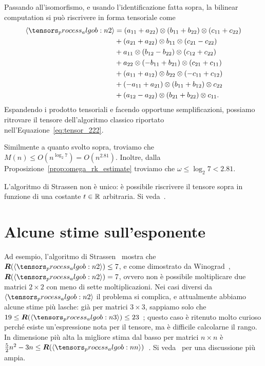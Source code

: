 Passando all'isomorfismo, e usando l'identificazione fatta sopra, la bilinear computation si può
riscrivere in forma tensoriale come
\begin{equation*}
	\begin{aligned}
		\algob{2} & = (a_{11} + a_{22}) \otimes (b_{11} + b_{22}) \otimes (c_{11} + c_{22}) \\
		          & + (a_{21} + a_{22}) \otimes b_{11} \otimes (c_{21} - c_{22})            \\
		          & + a_{11} \otimes (b_{12} - b_{22}) \otimes (c_{12} + c_{22})            \\
		          & + a_{22} \otimes (-b_{11} + b_{21}) \otimes (c_{21} + c_{11})           \\
		          & + (a_{11} + a_{12}) \otimes b_{22} \otimes (-c_{11} + c_{12})           \\
		          & + (-a_{11} + a_{21}) \otimes (b_{11} + b_{12}) \otimes c_{22}           \\ &+ (a_{12} - a_{22}) \otimes (b_{21} + b_{22}) \otimes c_{11}.
	\end{aligned}
\end{equation*}
Espandendo i prodotto tensoriali e facendo opportune semplificazioni, possiamo ritrovare il tensore
dell'algoritmo classico riportato nell'Equazione~\eqref{eq:tensor_222}.
\begin{remark}
	Similmente a quanto svolto sopra, troviamo che $ M(n) \le  O(n^{\log_{2}
				7}) = O(n^{2.81})$. Inoltre, dalla Proposizione~\ref{prop:omega_rk_estimate} troviamo che $ \omega
		\le \log_2 7 < 2.81$.
\end{remark}

\begin{remark}
	L'algoritmo di Strassen non è unico: è possibile riscrivere il tensore sopra in funzione di una
	costante $ t \in \mathbb{R} $ arbitraria. Si veda~\cite[Pag. 37]{landsberg2011tensors}.
\end{remark}

\section{Alcune stime sull'esponente}
\label{sec:exp_estimates}

Ad esempio, l'algoritmo di Strassen~\cite{strassen69} mostra che $ \rk(\algob{2}) \le 7$, e
come dimostrato da Winograd~\cite{winograd1971}, $ \rk(\algob{2}) = 7$, ovvero non è possibile moltiplicare due
matrici $ 2\times 2 $ con meno di sette moltiplicazioni.
Nei casi diversi da $ \algob{2} $ il problema si complica, e attualmente abbiamo alcune stime più lasche: già
per matrici $ 3\times 3 $, sappiamo solo che $ 19 \le \rk(\algob{3}) \le 23 $~\cite{BLASER200343,
	bams/1183537626}; questo caso è ritenuto molto curioso perché esiste un'espressione nota per il
tensore, ma è difficile calcolarne il rango. In dimensione più alta la migliore stima dal basso per matrici $ n\times n $ è $ \frac{5}{2}n^2 - 3n \le
	\rk(\algob{n}) $~\cite{blaser2001}. Si veda~\cite[Capitolo 11]{landsberg2011tensors} per una
discussione più ampia.

